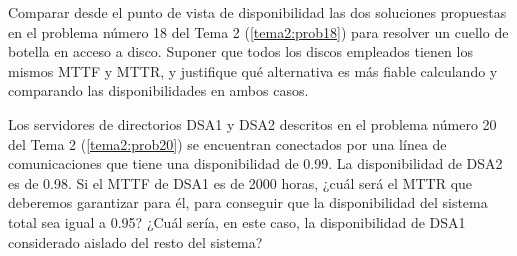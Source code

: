 \begin{problem}[9]
Comparar desde el punto de vista de disponibilidad las dos soluciones propuestas en el problema número 18 del Tema 2 (\ref{tema2:prob18}) para resolver un cuello de botella en acceso a disco. Suponer que todos los discos empleados tienen los mismos MTTF y MTTR, y justifique qué alternativa es más fiable calculando y comparando las disponibilidades en ambos casos.

\solution


\end{problem}

\begin{problem}[10]
Los servidores de directorios DSA1 y DSA2 descritos en el problema número 20 del Tema 2 (\ref{tema2:prob20})
 se encuentran conectados por una línea de comunicaciones que tiene una
disponibilidad de 0.99. La disponibilidad de DSA2 es de 0.98. Si el MTTF
 de DSA1 es de 2000 horas, ¿cuál será el MTTR que deberemos garantizar
para él, para conseguir que la disponibilidad del sistema total sea
igual a 0.95? ¿Cuál sería, en este caso, la disponibilidad de DSA1
considerado aislado del resto del sistema?

\solution


\end{problem}

